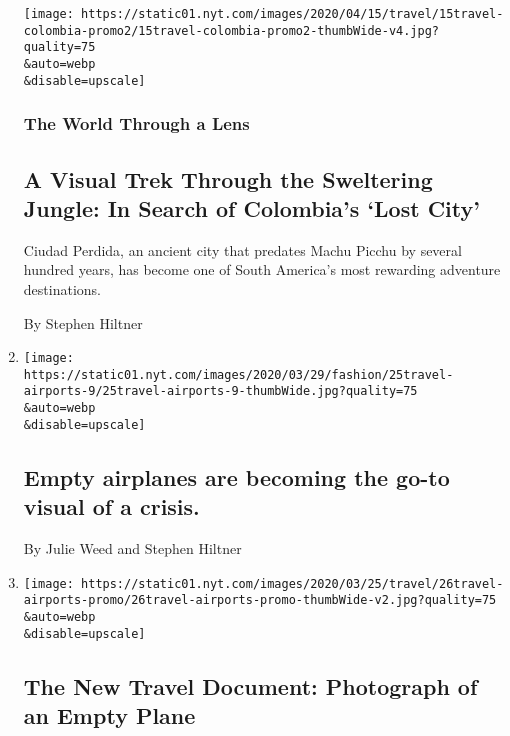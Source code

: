 \begin{enumerate}
  \texttt{[image: https://static01.nyt.com/images/2020/04/15/travel/15travel-colombia-promo2/15travel-colombia-promo2-thumbWide-v4.jpg?quality=75\\\&auto=webp\\\&disable=upscale]}

  \hypertarget{the-world-through-a-lens}{%
  \subsubsection{The World Through a
  Lens}\label{the-world-through-a-lens}}

  \hypertarget{a-visual-trek-through-the-sweltering-jungle-in-search-of-colombias-lost-city}{%
  \subsection{A Visual Trek Through the Sweltering Jungle: In Search of
  Colombia's `Lost
  City'}\label{a-visual-trek-through-the-sweltering-jungle-in-search-of-colombias-lost-city}}

  Ciudad Perdida, an ancient city that predates Machu Picchu by several
  hundred years, has become one of South America's most rewarding
  adventure destinations.

  By Stephen Hiltner
\item
  \href{/live/2020/coronavirus-usa-03-26/empty-airplanes-are-becoming-the-go-to-visual-of-a-crisis}{}

  \texttt{[image: https://static01.nyt.com/images/2020/03/29/fashion/25travel-airports-9/25travel-airports-9-thumbWide.jpg?quality=75\\\&auto=webp\\\&disable=upscale]}

  \hypertarget{empty-airplanes-are-becoming-the-go-to-visual-of-a-crisis}{%
  \subsection{Empty airplanes are becoming the go-to visual of a
  crisis.}\label{empty-airplanes-are-becoming-the-go-to-visual-of-a-crisis}}

  By Julie Weed and Stephen Hiltner
\item
  \href{/2020/03/26/travel/coronavirus-empty-planes.html}{}

  \texttt{[image: https://static01.nyt.com/images/2020/03/25/travel/26travel-airports-promo/26travel-airports-promo-thumbWide-v2.jpg?quality=75\\\&auto=webp\\\&disable=upscale]}

  \hypertarget{the-new-travel-document-photograph-of-an-empty-plane}{%
  \subsection{The New Travel Document: Photograph of an Empty
  Plane}\label{the-new-travel-document-photograph-of-an-empty-plane}}


\end{enumerate}
